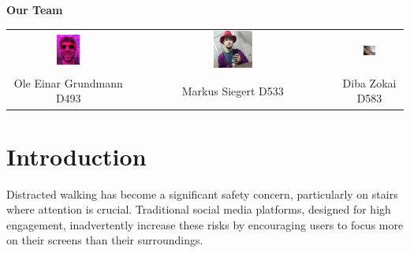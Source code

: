 \documentclass{article}
\begin{document}
\begin{titlepage}
    \begin{center}
        \textbf{\textcolor{TikTokBlack}{\Large Our Team}} \\[0.5cm]

        \begin{tabular}{ccc}
            \includegraphics[width=0.2\textwidth]{./resources/ole.png} &
            \includegraphics[width=0.2\textwidth]{./resources/markus.png} &
            \includegraphics[width=0.2\textwidth]{./resources/diba.png} \\[0.3cm]
            Ole Einar Grundmann D493 & Markus Siegert D533 & Diba Zokai D583 \\
        \end{tabular}
    \end{center}
\end{titlepage}

\newpage
\tableofcontents
\newpage

\section{Introduction}
Distracted walking has become a significant safety concern, particularly on stairs where attention is crucial.
Traditional social media platforms, designed for high engagement,
inadvertently increase these risks by encouraging users to focus more on their screens than their surroundings.
\end{document}
